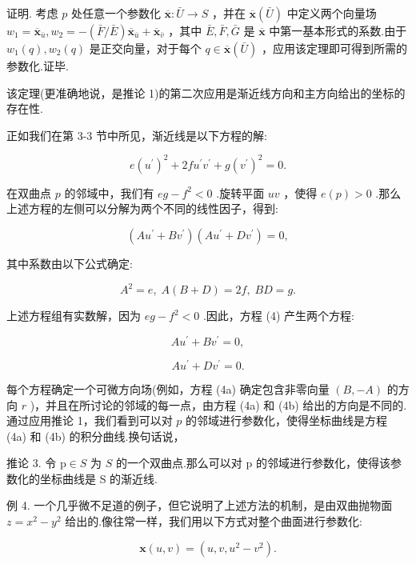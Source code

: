 证明. 考虑 \(p\) 处任意一个参数化 \(\overline{\mathbf{x}} : \bar{U} \rightarrow  S\) ，并在 \(\overline{\mathbf{x}}\left( \bar{U}\right)\) 中定义两个向量场 \({w}_{1} = {\overline{\mathbf{x}}}_{\bar{u}},{w}_{2} =  - \left( {\bar{F}/\bar{E}}\right) {\overline{\mathbf{x}}}_{\bar{u}} + {\overline{\mathbf{x}}}_{\bar{v}}\) ，其中 \(\bar{E},\bar{F},\bar{G}\) 是 \(\overline{\mathbf{x}}\) 中第一基本形式的系数.由于 \({w}_{1}\left( q\right) ,{w}_{2}\left( q\right)\) 是正交向量，对于每个 \(q \in  \overline{\mathbf{x}}\left( \bar{U}\right)\) ，应用该定理即可得到所需的参数化.证毕.

该定理(更准确地说，是推论 1)的第二次应用是渐近线方向和主方向给出的坐标的存在性.

正如我们在第 3-3 节中所见，渐近线是以下方程的解:

\[
e{\left( {u}^{\prime }\right) }^{2} + {2f}{u}^{\prime }{v}^{\prime } + g{\left( {v}^{\prime }\right) }^{2} = 0.
\]

在双曲点 \(p\) 的邻域中，我们有 \({eg} - {f}^{2} < 0\) .旋转平面 \({uv}\) ，使得 \(e\left( p\right)  > 0\) .那么上述方程的左侧可以分解为两个不同的线性因子，得到:

\[
\left( {A{u}^{\prime } + B{v}^{\prime }}\right) \left( {A{u}^{\prime } + D{v}^{\prime }}\right)  = 0, \tag{4}
\]

其中系数由以下公式确定:

\[
{A}^{2} = e,\;A\left( {B + D}\right)  = {2f},\;{BD} = g.
\]

上述方程组有实数解，因为 \({eg} - {f}^{2} < 0\) .因此，方程 (4) 产生两个方程:

\[
A{u}^{\prime } + B{v}^{\prime } = 0, \tag{4a}
\]

\[
A{u}^{\prime } + D{v}^{\prime } = 0. \tag{4b}
\]

每个方程确定一个可微方向场(例如，方程 (4a) 确定包含非零向量 \(\left( {B, - A}\right)\) 的方向 \(r\) )，并且在所讨论的邻域的每一点，由方程 (4a) 和 (4b) 给出的方向是不同的.通过应用推论 1，我们看到可以对 \(p\) 的邻域进行参数化，使得坐标曲线是方程 (4a) 和 (4b) 的积分曲线.换句话说，

推论 3. 令 \(\mathrm{p} \in  S\) 为 \(S\) 的一个双曲点.那么可以对 \(\mathrm{p}\) 的邻域进行参数化，使得该参数化的坐标曲线是 S 的渐近线.

例 4. 一个几乎微不足道的例子，但它说明了上述方法的机制，是由双曲抛物面 \(z = {x}^{2} - {y}^{2}\) 给出的.像往常一样，我们用以下方式对整个曲面进行参数化:

\[
\mathbf{x}\left( {u,v}\right)  = \left( {u,v,{u}^{2} - {v}^{2}}\right) .
\]

